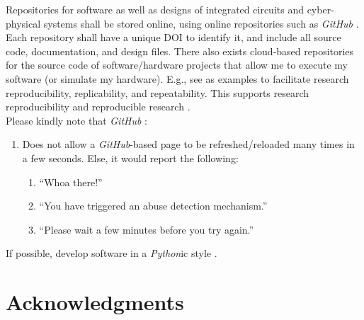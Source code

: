 \documentclass[letter,12pt]{article}
\begin{document}
Repositories for software as well as designs of integrated circuits and cyber-physical systems shall be stored online, using online repositories such as {\it GitHub} \cite{GitHubStaff2016}. Each repository shall have a unique DOI to identify it, and include all source code, documentation, and design files. There also exists cloud-based repositories for the source code of software/hardware projects that allow me to execute my software (or simulate my hardware). E.g., see \cite{CodeOceanstaff2017,RunMyCodeAssociationMembers2013} as examples to facilitate research reproducibility, replicability, and repeatability. This supports research reproducibility and reproducible research \cite{Schiermeier2018,Baumer2017,CodeOceanstaff2017,DatopianAtomaticLtdIncStaff2017,Kim2017,Mailund2017,Barba2016,Gandrud2015,Liberman2015,Creswell2014,Gandrud2014,Stodden2014,RunMyCodeAssociationMembers2013,Blackburn20XY,Geier20XY,Krishnamurthi20XY}. \\

Please kindly note that {\it GitHub} \cite{GitHubStaff2016}: \vspace{-0.3cm}
\begin{enumerate} \itemsep -4pt
\item Does not allow a {\it GitHub}-based page to be refreshed/reloaded many times in a few seconds. Else, it would report the following: \vspace{-0.3cm}
	\begin{enumerate} \itemsep -2pt
	\item ``Whoa there!''
	\item ``You have triggered an abuse detection mechanism.''
	\item ``Please wait a few minutes before you try again.''
	\end{enumerate}
\end{enumerate}



If possible, develop software in a {\it Python}ic style \cite[Chapter 1, pp. 1--12,12--17]{Alchin2010} \cite{Jon2014,Reitz2016a,Reitz2016,Preshing2014,Franca2014,vanRossum2013}.




\section*{Acknowledgments}
\label{sec:Acknowledgments}
\end{document}
